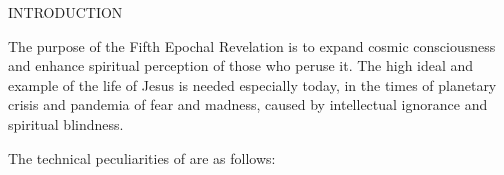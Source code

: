 \newpage
\thispagestyle{empty}

\makeatletter
{}%
\makeatother

\begin{center}
\bibpapertitlefont
INTRODUCTION
\end{center}


The purpose of the Fifth Epochal Revelation is to expand cosmic consciousness and enhance spiritual perception of those who
peruse it.
The high ideal and example of the life of Jesus is needed especially today,
in the times of planetary crisis and pandemia of fear and madness, caused by intellectual ignorance and spiritual blindness.

The technical peculiarities of  are as follows:

